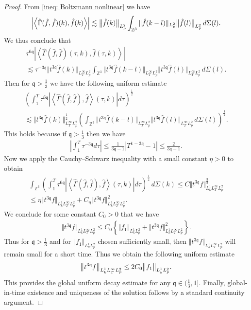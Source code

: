 \documentclass[reqno]{amsart}
\newcommand{\pv}{p}
\def\norm#1{\big\Vert#1\big\Vert}
\newcommand{\irnp}[2]{\left\langle {#1},{#2} \right\rangle}
\newcommand{\qq}{\mathfrak{q}}
\newcommand{\Z}{\mathbb{Z}}
\theoremstyle{definition}
\numberwithin{equation}{section}
\numberwithin{theorem}{section}
\begin{document}
\begin{proof}
From \eqref{ineq: Boltzmann nonlinear} we have 
\begin{align}\notag
\left| \irnp{\hat{\Gamma}(\hat{f},\hat{f})(k)}{\hat{f}(k)}\right|\lesssim \norm{\hat{f}(k)}_{L^2_{\pv}}\int_{\Z^3}\Vert \hat{f}(k-l)\Vert_{L^2_{\pv}} \norm{\hat{f}(l)}_{L^2_{\pv}}  \,d\Sigma(l).
\end{align}
We thus conclude that 
\begin{multline*}
   \tau^{6\qq}\left| \irnp{\hat{\Gamma}(\hat{f},\hat{f})(\tau,k)}{\hat{f}(\tau,k)}\right|
   \\
   \lesssim 
   \tau^{-3\qq}{\norm{t^{3\qq} \hat{f}(k)}_{L^\infty_TL^2_{\pv}}}
\int_{\Z^3}  {\norm{t^{3\qq} \hat{f}(k-l)}_{L^\infty_TL^2_{\pv}}}{\norm{t^{3\qq} \hat{f}(l)}_{L^\infty_TL^2_{\pv}}} \,d\Sigma(l). 
\end{multline*}
Then for $\qq > \frac{1}{3}$ we have the following uniform estimate
\begin{multline*}
\left(\int^T_1 \tau^{6\qq} \left|{\irnp{\hat{\Gamma}(\hat{f},\hat{f})}{\hat{f}}}(\tau,k)\right|
d\tau \right)^{\frac12}
\\
\lesssim 
{\norm{t^{3\qq} \hat{f}(k)}^{\frac12}_{L^\infty_TL^2_{\pv}}}
\left(\int_{\Z^3}  {\norm{t^{3\qq} \hat{f}(k-l)}_{L^\infty_TL^2_{\pv}}}{\norm{t^{3\qq} \hat{f}(l)}_{L^\infty_TL^2_{\pv}}} \,d\Sigma(l) \right)^{\frac12}.
\end{multline*}
This holds because if $\qq > \frac{1}{3}$ then we have 
\begin{align*}
  \left|   \int^T_1 \tau^{-3\qq} d\tau \right| \leq  \frac{1}{3\qq-1}\left|  T^{1-3\qq}-1 \right| \leq \frac{2}{3\qq-1}. 
\end{align*}
Now we apply the Cauchy--Schwarz inequality with a small constant $\eta>0$ to obtain 
\begin{multline*}
\int_{\Z^3} \left(\int^T_1 \tau^{6\qq} \left|{\irnp{\hat{\Gamma}(\hat{f},\hat{f})}{\hat{f}}}(\tau,k)\right|
d\tau \right)^{\frac12} \,d\Sigma(k) 
\leq C {\norm{t^{3\qq} {f}}^{\frac32}_{L^1_k L^\infty_TL^2_{\pv}}}
\\
\leq
\eta {\norm{t^{3\qq} {f}}_{L^1_k L^\infty_TL^2_{\pv}}}
+
C_\eta {\norm{t^{3\qq} {f}}^{2}_{L^1_k L^\infty_TL^2_{\pv}}}.
\end{multline*}
We conclude for some constant $C_0>0$ that we have 
\begin{align*}
{\norm{t^{3\qq} f}_{L^1_kL^\infty_TL^2_{\pv}}}
\leq 
C_0\left\{ \norm{f_1}_{L^1_kL^2_{\pv}}
+
{\norm{t^{3\qq} {f}}^{2}_{L^1_k L^\infty_TL^2_{\pv}}}
\right\}.  
\end{align*}
Thus for $\qq > \frac{1}{3}$ and for $\norm{f_1}_{L^1_kL^2_{\pv}}$ chosen sufficiently small, then ${\norm{t^{3\qq} f}_{L^1_kL^\infty_TL^2_{\pv}}}$ will remain small for a short time.   Thus we obtain the following uniform estimate 
\begin{align}\notag 
{\norm{t^{3\qq} f}_{L^1_kL^\infty_TL^2_{\pv}}}
\leq 
2C_0 \norm{f_1}_{L^1_kL^2_{\pv}}.  
\end{align}
This provides the global uniform decay estimate for any $\qq \in (\frac{1}{3},1]$. Finally, global-in-time existence and uniqueness of the solution follows by a standard continuity argument.
\end{proof}
\end{document}
